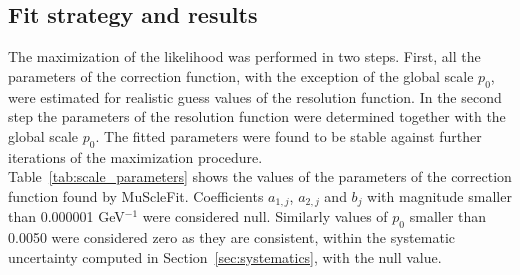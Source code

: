 \subsection{Fit strategy and results}
The maximization of the likelihood was performed in two steps. 
First, all the parameters of the correction
function, with the exception of the global scale $p_0$, were estimated 
for realistic guess values of the resolution function. In the second step
the parameters of the resolution function were determined together
with the global scale $p_0$. 
The fitted parameters were found to be stable against further
iterations of the maximization procedure.\\
Table~\ref{tab:scale_parameters} shows the values of the 
parameters of the correction function found by MuScleFit. 
Coefficients $a_{1,j}$, $a_{2,j}$ and $b_j$ with magnitude smaller than
0.000001 GeV$^{-1}$ were considered null. Similarly values
of $p_0$ smaller than 0.0050 were considered zero as they 
are consistent, within the systematic uncertainty 
computed in Section~\ref{sec:systematics}, with the null value.
